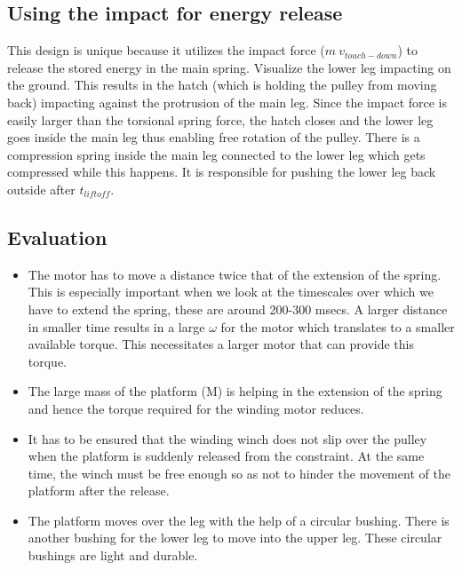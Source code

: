 \subsection*{Using the impact for energy release}
This design is unique because it utilizes the impact force ($m\:v_{touch-down}$) to release the stored energy in the main
spring. Visualize the lower leg impacting on the ground. This results in the hatch (which is holding the pulley from
moving back) impacting against the protrusion of the main leg. Since the impact force is easily larger than the torsional
spring force, the hatch closes and the lower leg goes inside the main leg thus enabling free rotation of the pulley. There
is a compression spring inside the main leg connected to the lower leg which gets compressed while this happens. It is
responsible for pushing the lower leg back outside after $t_{liftoff}$.

\subsection{Evaluation}
\begin{itemize}
\item
The motor has to move a distance twice that of the extension of the spring. This is
especially important when we look at the timescales over which we have to extend the spring, these are around
200-300 msecs. A larger distance in smaller time results in a large $\omega$ for the motor which translates
to a smaller available torque. This necessitates a larger motor that can provide this torque. 
\item
The large mass of the platform (M) is helping in the extension of the spring and hence the torque required
for the winding motor reduces.
\item
It has to be ensured that the winding winch does not slip over the pulley when the platform is suddenly released from
the constraint. At the same time, the winch must be free enough so as not to hinder the movement of the platform after
the release.
\item
The platform moves over the leg with the help of a circular bushing. There is another bushing for the lower leg
to move into the upper leg. These circular bushings are light and durable.
\end{itemize}

